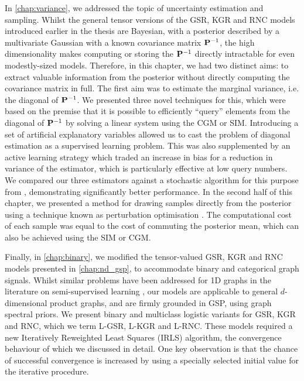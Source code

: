In \cref{chap:variance}, we addressed the topic of uncertainty estimation and sampling. Whilst the general tensor versions of the GSR, KGR and RNC models introduced earlier in the thesis are Bayesian, with a posterior described by a multivariate Gaussian with a known covariance matrix $\mathbf{P}^{-1}$, the high dimensionality makes computing or storing the $\mathbf{P}^{-1}$ directly intractable for even modestly-sized models. Therefore, in this chapter, we had two distinct aims: to extract valuable information from the posterior without directly computing the covariance matrix in full. The first aim was to estimate the marginal variance, i.e. the diagonal of $\mathbf{P}^{-1}$. We presented three novel techniques for this, which were based on the premise that it is possible to efficiently ``query'' elements from the diagonal of $\mathbf{P}^{-1}$ by solving a linear system using the CGM or SIM.  Introducing a set of artificial explanatory variables allowed us to cast the problem of diagonal estimation as a supervised learning problem. This was also supplemented by an active learning strategy which traded an increase in bias for a reduction in variance of the estimator, which is particularly effective at low query numbers. We compared our three estimators against a stochastic algorithm for this purpose from \cite{Bekas2007}, demonstrating significantly better performance. In the second half of this chapter, we presented a method for drawing samples directly from the posterior using a technique known as perturbation optimisation \citep{Orieux2012}. The computational cost of each sample was equal to the cost of commuting the posterior mean, which can also be achieved using the SIM or CGM. 

Finally, in \cref{chap:binary}, we modified the tensor-valued GSR, KGR and RNC models presented in \cref{chap:nd_gsp}, to accommodate binary and categorical graph signals. Whilst similar problems have been addressed for 1D graphs in the literature on semi-supervised learning \cite{Kondor2002,Zhu2003}, our models are applicable to general $d$-dimensional product graphs, and are firmly grounded in GSP, using graph spectral priors. We present binary and multiclass logistic variants for GSR, KGR and RNC, which we term L-GSR, L-KGR and L-RNC. These models required a new Iteratively Reweighted Least Squares (IRLS) algorithm, the convergence behaviour of which we discussed in detail. One key observation is that the chance of successful convergence is increased by using a specially selected initial value for the iterative procedure.  


